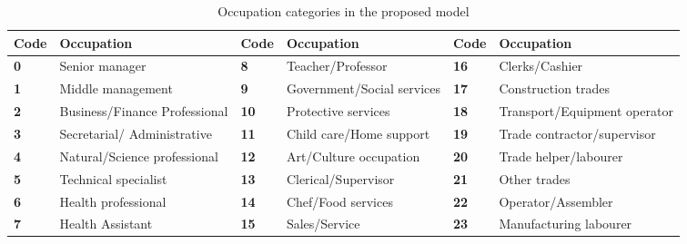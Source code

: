\renewcommand{\arraystretch}{1}
\begin{table}[H]
    \begin{tabular}{p{1cm}p{4cm}p{1cm}p{4cm}p{1cm}p{4cm}}
        \textbf{Code} & \textbf{Occupation} & \textbf{Code} & \textbf{Occupation} & \textbf{Code} & \textbf{Occupation}\\
        \hline
        \rowcolor{lightgray} \textbf{0} & Senior manager  & \textbf{8} & Teacher/Professor & \textbf{16} & Clerks/Cashier\\

        \textbf{1} & Middle management & \textbf{9} & Government/Social services & \textbf{17} & Construction trades\\

        \rowcolor{lightgray} \textbf{2} & Business/Finance Professional & \textbf{10} & Protective services & \textbf{18} & Transport/Equipment operator\\

        \textbf{3} & Secretarial/ Administrative & \textbf{11} & Child care/Home support & \textbf{19} & Trade contractor/supervisor\\

        \rowcolor{lightgray} \textbf{4} & Natural/Science professional & \textbf{12} & Art/Culture occupation & \textbf{20} & Trade helper/labourer\\

        \textbf{5} & Technical specialist & \textbf{13} & Clerical/Supervisor & \textbf{21} & Other trades\\

        \rowcolor{lightgray} \textbf{6} & Health professional & \textbf{14} & Chef/Food services & \textbf{22} & Operator/Assembler\\

        \textbf{7} & Health Assistant & \textbf{15} & Sales/Service & \textbf{23} & Manufacturing labourer\\

        \hline
    \end{tabular}
    \caption{\label{table:occupations} Occupation categories in the proposed model}
\end{table}


